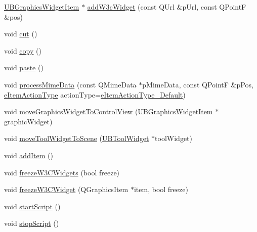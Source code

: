 \begin{DoxyCompactItemize}
\item 
\hyperlink{class_u_b_graphics_widget_item}{U\-B\-Graphics\-Widget\-Item} $\ast$ \hyperlink{class_u_b_board_controller_af8867753146efd8498f1a308e0457c9e}{add\-W3c\-Widget} (const Q\-Url \&p\-Url, const Q\-Point\-F \&pos)
\item 
void \hyperlink{class_u_b_board_controller_aedaf462295a3ad1a7c7e76bf88078e8f}{cut} ()
\item 
void \hyperlink{class_u_b_board_controller_ab051041eb5a593e66b25653086a32834}{copy} ()
\item 
void \hyperlink{class_u_b_board_controller_a68518a98107e994551da0a4e3a79fe2c}{paste} ()
\item 
void \hyperlink{class_u_b_board_controller_a07e50010567075b570140d6143c516f5}{process\-Mime\-Data} (const Q\-Mime\-Data $\ast$p\-Mime\-Data, const Q\-Point\-F \&p\-Pos, \hyperlink{_u_b_board_controller_8h_a81078322485d3c56644c4f3414ac1c91}{e\-Item\-Action\-Type} action\-Type=\hyperlink{_u_b_board_controller_8h_a81078322485d3c56644c4f3414ac1c91abca7f0295fd0737e3216ce238a870c29}{e\-Item\-Action\-Type\-\_\-\-Default})
\item 
void \hyperlink{class_u_b_board_controller_af713d6e325369af244f2af8c90299a35}{move\-Graphics\-Widget\-To\-Control\-View} (\hyperlink{class_u_b_graphics_widget_item}{U\-B\-Graphics\-Widget\-Item} $\ast$graphic\-Widget)
\item 
void \hyperlink{class_u_b_board_controller_af122a3bb14b0ef66b169be9fd0e5a2b3}{move\-Tool\-Widget\-To\-Scene} (\hyperlink{class_u_b_tool_widget}{U\-B\-Tool\-Widget} $\ast$tool\-Widget)
\item 
void \hyperlink{class_u_b_board_controller_a0a2ba2fe74609d2bb43ad1b6893b59c4}{add\-Item} ()
\item 
void \hyperlink{class_u_b_board_controller_a4e526bf1704cc013539413d792c65d6a}{freeze\-W3\-C\-Widgets} (bool freeze)
\item 
void \hyperlink{class_u_b_board_controller_a3e83388ec403a3bec62277e1b1a0144f}{freeze\-W3\-C\-Widget} (Q\-Graphics\-Item $\ast$item, bool freeze)
\item 
void \hyperlink{class_u_b_board_controller_a19e197f121e0ed3e0204e7d528dc6307}{start\-Script} ()
\item 
void \hyperlink{class_u_b_board_controller_ab9ade242e787595dd2dbafdf3b3329a5}{stop\-Script} ()
\end{DoxyCompactItemize}
